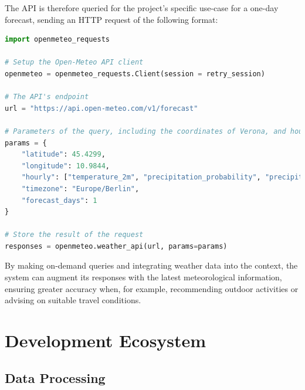 The API is therefore queried for the project's specific use-case for a one-day forecast, sending an HTTP request of the following format:

\begin{center}
\begin{minipage}{0.7\textwidth}
\begin{lstlisting}[language=Python, frame=single, caption=Open-Meteo HTTP Reuquest]
import openmeteo_requests

# Setup the Open-Meteo API client
openmeteo = openmeteo_requests.Client(session = retry_session)
    
# The API's endpoint
url = "https://api.open-meteo.com/v1/forecast"

# Parameters of the query, including the coordinates of Verona, and hourly data of temperature, precipitation and precipitation probability for the current day
params = {
    "latitude": 45.4299,
    "longitude": 10.9844,
    "hourly": ["temperature_2m", "precipitation_probability", "precipitation", "weather_code"],
    "timezone": "Europe/Berlin",
    "forecast_days": 1
}

# Store the result of the request
responses = openmeteo.weather_api(url, params=params)
\end{lstlisting}
\end{minipage}
\end{center}

By making on-demand queries and integrating weather data into the context, the system can augment its responses with the latest meteorological information, ensuring greater accuracy when, for example, recommending outdoor activities or advising on suitable travel conditions.




\section{Development Ecosystem}
\label{sec:development-ecosystem}

\subsection{Data Processing}
\label{sec:data-preprocessing}

